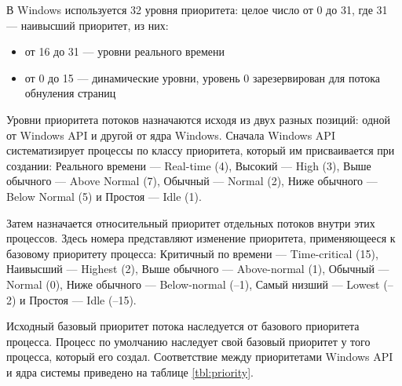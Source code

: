         В Windows используется 32 уровня приоритета: целое число от 0 до 31, где 31 — наивысший приоритет, из них:
        
        \begin{itemize}
            \item от 16 до 31 — уровни реального времени
            \item от 0 до 15 — динамические уровни, уровень 0 зарезервирован для потока обнуления страниц
        \end{itemize}
        
        Уровни приоритета потоков назначаются исходя из двух разных позиций: одной от Windows API и другой от ядра Windows. Сначала Windows API систематизирует процессы по классу приоритета, который им присваивается при создании: Реального времени — Real-time (4), Высокий — High (3), Выше обычного — Above Normal (7), Обычный — Normal (2), Ниже обычного — Below Normal (5) и Простоя — Idle (1).
        
        Затем назначается относительный приоритет отдельных потоков внутри этих процессов. Здесь номера представляют изменение приоритета, применяющееся к базовому приоритету процесса: Критичный по времени — Time-critical (15), Наивысший — Highest (2), Выше обычного — Above-normal (1), Обычный — Normal (0), Ниже обычного — Below-normal (–1), Самый низший — Lowest (–2) и Простоя — Idle (–15).

        
        Исходный базовый приоритет потока наследуется от базового приоритета процесса. Процесс по умолчанию наследует свой базовый приоритет у того процесса, который его создал. Соответствие между приоритетами Windows API и ядра системы приведено на таблице \ref{tbl:priority}.
        
